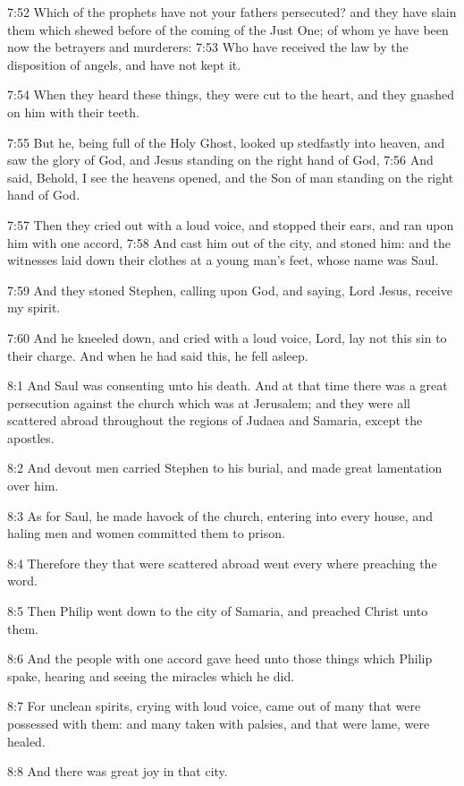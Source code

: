7:52 Which of the prophets have not your fathers persecuted? and they
have slain them which shewed before of the coming of the Just One; of
whom ye have been now the betrayers and murderers: 7:53 Who have
received the law by the disposition of angels, and have not kept it.

7:54 When they heard these things, they were cut to the heart, and
they gnashed on him with their teeth.

7:55 But he, being full of the Holy Ghost, looked up stedfastly into
heaven, and saw the glory of God, and Jesus standing on the right hand
of God, 7:56 And said, Behold, I see the heavens opened, and the Son
of man standing on the right hand of God.

7:57 Then they cried out with a loud voice, and stopped their ears,
and ran upon him with one accord, 7:58 And cast him out of the city,
and stoned him: and the witnesses laid down their clothes at a young
man's feet, whose name was Saul.

7:59 And they stoned Stephen, calling upon God, and saying, Lord
Jesus, receive my spirit.

7:60 And he kneeled down, and cried with a loud voice, Lord, lay not
this sin to their charge. And when he had said this, he fell asleep.

8:1 And Saul was consenting unto his death. And at that time there was
a great persecution against the church which was at Jerusalem; and
they were all scattered abroad throughout the regions of Judaea and
Samaria, except the apostles.

8:2 And devout men carried Stephen to his burial, and made great
lamentation over him.

8:3 As for Saul, he made havock of the church, entering into every
house, and haling men and women committed them to prison.

8:4 Therefore they that were scattered abroad went every where
preaching the word.

8:5 Then Philip went down to the city of Samaria, and preached Christ
unto them.

8:6 And the people with one accord gave heed unto those things which
Philip spake, hearing and seeing the miracles which he did.

8:7 For unclean spirits, crying with loud voice, came out of many that
were possessed with them: and many taken with palsies, and that were
lame, were healed.

8:8 And there was great joy in that city.

